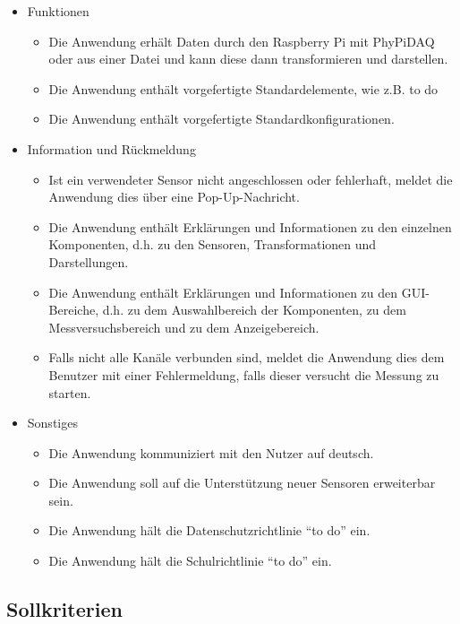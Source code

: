 \documentclass[parskip=full]{scrartcl}
\begin{document}
\begin{itemize}
\item Funktionen
\begin{itemize}

\item Die Anwendung erhält Daten durch den Raspberry Pi mit PhyPiDAQ oder aus einer Datei und kann diese dann transformieren und darstellen.
\item Die Anwendung enthält vorgefertigte Standardelemente, wie z.B. to do
\item Die Anwendung enthält vorgefertigte Standardkonfigurationen.

\end{itemize}

\item Information und Rückmeldung
\begin{itemize}

\item Ist ein verwendeter Sensor nicht angeschlossen oder fehlerhaft, meldet die Anwendung dies über eine Pop-Up-Nachricht.
\item Die Anwendung enthält Erklärungen und Informationen zu den einzelnen Komponenten, d.h. zu den Sensoren, Transformationen und Darstellungen.
\item Die Anwendung enthält Erklärungen und Informationen zu den GUI-Bereiche, d.h. zu dem Auswahlbereich der Komponenten, zu dem Messversuchsbereich und zu dem Anzeigebereich.
\item Falls nicht alle Kanäle verbunden sind, meldet die Anwendung dies dem Benutzer mit einer Fehlermeldung, falls dieser versucht die Messung zu starten. 

\end{itemize}

\item Sonstiges
\begin{itemize}

\item Die Anwendung kommuniziert mit den Nutzer auf deutsch.
\item Die Anwendung soll auf die Unterstützung neuer Sensoren erweiterbar sein.
\item Die Anwendung hält die Datenschutzrichtlinie "`to do"' ein.
\item Die Anwendung hält die Schulrichtlinie "`to do"' ein.

\end{itemize}

 \end{itemize}

\subsection{Sollkriterien}
\end{document}
